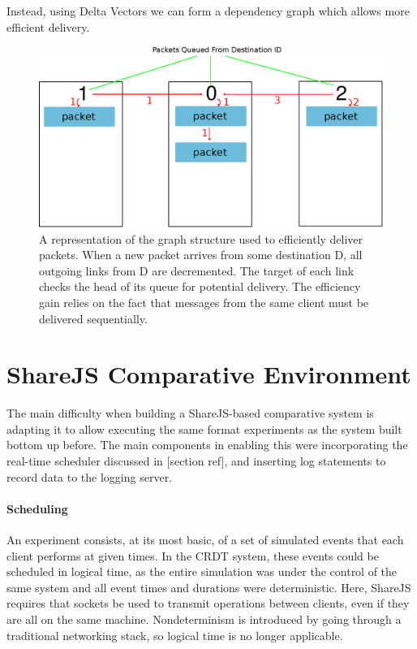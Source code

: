 \documentclass[12pt,a4paper,twoside,openright]{report}
\begin{document}
		Instead, using Delta Vectors we can form a dependency graph which allows more efficient delivery.
		
		\begin{figure}[H]
		\centering
		\includegraphics[width=1\linewidth]{figs/efficient_message_buffer.eps}
		\caption[Dependency Graph in Message Buffer]{A representation of the graph structure used to efficiently deliver packets. When a new packet arrives from some destination D, all outgoing links from D are decremented. The target of each link checks the head of its queue for potential delivery. The efficiency gain relies on the fact that messages from the same client must be delivered sequentially.}
		\label{fig:efficient}
		\end{figure}
	
	
\section{ShareJS Comparative Environment}

	The main difficulty when building a ShareJS-based comparative system is adapting it to allow executing the same format experiments as the system built bottom up before. The main components in enabling this were incorporating the real-time scheduler discussed in [section ref], and inserting log statements to record data to the logging server.
	
	\paragraph{Scheduling}
	An experiment consists, at its most basic, of a set of simulated events that each client performs at given times. In the CRDT system, these events could be scheduled in logical time, as the entire simulation was under the control of the same system and all event times and durations were deterministic. Here, ShareJS requires that sockets be used to transmit operations between clients, even if they are all on the same machine. Nondeterminism is introduced by going through a traditional networking stack, so logical time is no longer applicable.
	
\end{document}
